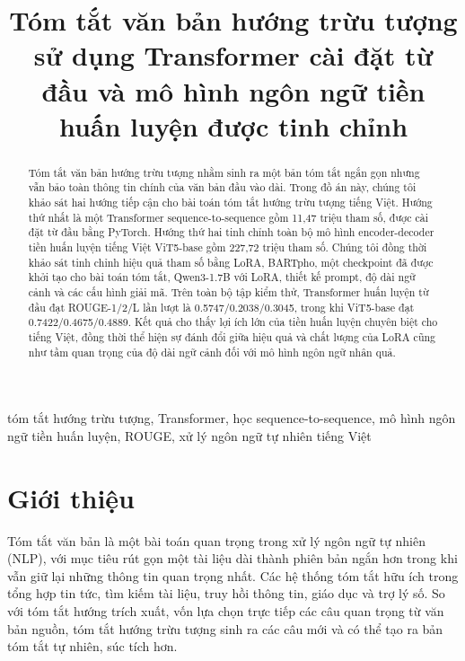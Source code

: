 \documentclass[conference]{IEEEtran}
\begin{document}
\pagestyle{plain}

\title{Tóm tắt văn bản hướng trừu tượng sử dụng Transformer cài đặt từ đầu và mô hình ngôn ngữ tiền huấn luyện được tinh chỉnh}

\author{
}

\maketitle
\thispagestyle{plain}

\begin{abstract}
Tóm tắt văn bản hướng trừu tượng nhằm sinh ra một bản tóm tắt ngắn gọn nhưng vẫn bảo toàn thông tin chính của văn bản đầu vào dài. Trong đồ án này, chúng tôi khảo sát hai hướng tiếp cận cho bài toán tóm tắt hướng trừu tượng tiếng Việt. Hướng thứ nhất là một Transformer sequence-to-sequence gồm 11,47 triệu tham số, được cài đặt từ đầu bằng PyTorch. Hướng thứ hai tinh chỉnh toàn bộ mô hình encoder-decoder tiền huấn luyện tiếng Việt ViT5-base gồm 227,72 triệu tham số. Chúng tôi đồng thời khảo sát tinh chỉnh hiệu quả tham số bằng LoRA, BARTpho, một checkpoint đã được khởi tạo cho bài toán tóm tắt, Qwen3-1.7B với LoRA, thiết kế prompt, độ dài ngữ cảnh và các cấu hình giải mã. Trên toàn bộ tập kiểm thử, Transformer huấn luyện từ đầu đạt ROUGE-1/2/L lần lượt là 0.5747/0.2038/0.3045, trong khi ViT5-base đạt 0.7422/0.4675/0.4889. Kết quả cho thấy lợi ích lớn của tiền huấn luyện chuyên biệt cho tiếng Việt, đồng thời thể hiện sự đánh đổi giữa hiệu quả và chất lượng của LoRA cũng như tầm quan trọng của độ dài ngữ cảnh đối với mô hình ngôn ngữ nhân quả.
\end{abstract}

\begin{IEEEkeywords}
tóm tắt hướng trừu tượng, Transformer, học sequence-to-sequence, mô hình ngôn ngữ tiền huấn luyện, ROUGE, xử lý ngôn ngữ tự nhiên tiếng Việt
\end{IEEEkeywords}

\section{Giới thiệu}
Tóm tắt văn bản là một bài toán quan trọng trong xử lý ngôn ngữ tự nhiên (NLP), với mục tiêu rút gọn một tài liệu dài thành phiên bản ngắn hơn trong khi vẫn giữ lại những thông tin quan trọng nhất. Các hệ thống tóm tắt hữu ích trong tổng hợp tin tức, tìm kiếm tài liệu, truy hồi thông tin, giáo dục và trợ lý số. So với tóm tắt hướng trích xuất, vốn lựa chọn trực tiếp các câu quan trọng từ văn bản nguồn, tóm tắt hướng trừu tượng sinh ra các câu mới và có thể tạo ra bản tóm tắt tự nhiên, súc tích hơn.
\end{document}
